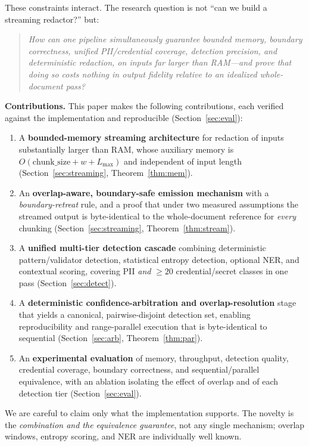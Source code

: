 \documentclass[conference]{IEEEtran}
\begin{document}
These constraints interact. The research question is not ``can we build a
streaming redactor?'' but:
\begin{quote}
\emph{How can one pipeline simultaneously guarantee bounded memory, boundary
correctness, unified PII/credential coverage, detection precision, and
deterministic redaction, on inputs far larger than RAM---and prove that doing so
costs nothing in output fidelity relative to an idealized whole-document pass?}
\end{quote}

\noindent\textbf{Contributions.} This paper makes the following contributions,
each verified against the implementation and reproducible
(Section~\ref{sec:eval}):
\begin{enumerate}
\item A \textbf{bounded-memory streaming architecture} for redaction of inputs
substantially larger than RAM, whose auxiliary memory is
$O(\text{chunk\_size}+w+L_{\max})$ and independent of input length
(Section~\ref{sec:streaming}, Theorem~\ref{thm:mem}).
\item An \textbf{overlap-aware, boundary-safe emission mechanism} with a
\emph{boundary-retreat} rule, and a proof that under two measured assumptions the
streamed output is byte-identical to the whole-document reference for
\emph{every} chunking (Section~\ref{sec:streaming}, Theorem~\ref{thm:stream}).
\item A \textbf{unified multi-tier detection cascade} combining deterministic
pattern/validator detection, statistical entropy detection, optional NER, and
contextual scoring, covering PII \emph{and} $\geq20$ credential/secret classes in
one pass (Section~\ref{sec:detect}).
\item A \textbf{deterministic confidence-arbitration and overlap-resolution}
stage that yields a canonical, pairwise-disjoint detection set, enabling
reproducibility and range-parallel execution that is byte-identical to sequential
(Section~\ref{sec:arb}, Theorem~\ref{thm:par}).
\item An \textbf{experimental evaluation} of memory, throughput, detection
quality, credential coverage, boundary correctness, and sequential/parallel
equivalence, with an ablation isolating the effect of overlap and of each
detection tier (Section~\ref{sec:eval}).
\end{enumerate}

We are careful to claim only what the implementation supports. The novelty is the
\emph{combination and the equivalence guarantee}, not any single mechanism;
overlap windows, entropy scoring, and NER are individually well known.
\end{document}
